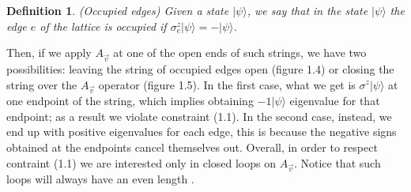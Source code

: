 \documentclass{Configuration_Files/PoliMi3i_thesis}
\newtheorem{definition}{Definition}[chapter]
\begin{document}
\begin{definition}(Occupied edges)
	Given a state $|\psi\rangle $, we say that in the state $|\psi\rangle $ the edge $e$ of the lattice is occupied if $\sigma^z_e |\psi\rangle  = - |\psi\rangle $.
\end{definition}

Then, if we apply $A_{\vec{v}} $ at one of the open ends of such strings, we have two possibilities: leaving the string of occupied edges open (figure 1.4) or closing the string over the $A_{\vec{v}} $ operator (figure 1.5).
In the first case, what we get is $\sigma^{z} |\psi\rangle$ at one endpoint of the string, which implies obtaining $-1|\psi\rangle$ eigenvalue for that endpoint; as a result we violate constraint (1.1). In the second case, instead, we end up with positive eigenvalues for each edge, this is because the negative signs obtained at the endpoints cancel themselves out. Overall, in order to respect contraint (1.1) we are interested only in closed loops on $A_{\vec{v}} $. Notice that such loops will always have an even length {\cite{Her20}}.
\end{document}
